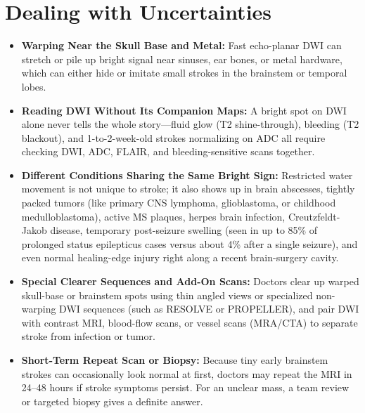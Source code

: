 \section{Dealing with Uncertainties}
\begin{itemize}
\item \textbf{Warping Near the Skull Base and Metal:} Fast echo-planar DWI can stretch or pile up bright signal near sinuses, ear bones, or metal hardware, which can either hide or imitate small strokes in the brainstem or temporal lobes.
\item \textbf{Reading DWI Without Its Companion Maps:} A bright spot on DWI alone never tells the whole story---fluid glow (T2 shine-through), bleeding (T2 blackout), and 1-to-2-week-old strokes normalizing on ADC all require checking DWI, ADC, FLAIR, and bleeding-sensitive scans together.
\item \textbf{Different Conditions Sharing the Same Bright Sign:} Restricted water movement is not unique to stroke; it also shows up in brain abscesses, tightly packed tumors (like primary CNS lymphoma, glioblastoma, or childhood medulloblastoma), active MS plaques, herpes brain infection, Creutzfeldt-Jakob disease, temporary post-seizure swelling (seen in up to 85\% of prolonged status epilepticus cases versus about 4\% after a single seizure), and even normal healing-edge injury right along a recent brain-surgery cavity.
\item \textbf{Special Clearer Sequences and Add-On Scans:} Doctors clear up warped skull-base or brainstem spots using thin angled views or specialized non-warping DWI sequences (such as RESOLVE or PROPELLER), and pair DWI with contrast MRI, blood-flow scans, or vessel scans (MRA/CTA) to separate stroke from infection or tumor.
\item \textbf{Short-Term Repeat Scan or Biopsy:} Because tiny early brainstem strokes can occasionally look normal at first, doctors may repeat the MRI in 24--48 hours if stroke symptoms persist. For an unclear mass, a team review or targeted biopsy gives a definite answer.
\end{itemize}

